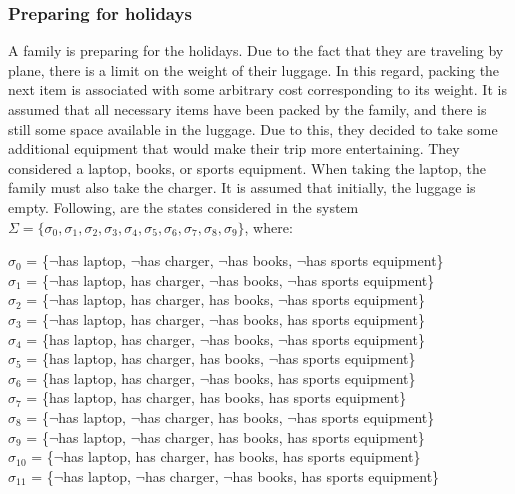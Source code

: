 \documentclass[a4paper]{article}
\begin{document}
\subsubsection{Preparing for holidays}
A family is preparing for the holidays. Due to the fact that they are traveling by plane, there is a limit on the weight of their luggage. In this regard, packing the next item is associated with some arbitrary cost corresponding to its weight. It is assumed that all necessary items have been packed by the family, and there is still some space available in the luggage. Due to this, they decided to take some additional equipment that would make their trip more entertaining. They considered a laptop, books, or sports equipment. When taking the laptop, the family must also take the charger. It is assumed that initially, the luggage is empty.
Following, are the states considered in the system $\Sigma = \{{\sigma_0, \sigma_1, \sigma_2, \sigma_3, \sigma_4, \sigma_5, \sigma_6, \sigma_7, \sigma_8, \sigma_9\}}$, where:
\begin{center}
$\sigma_0$ = \{$\neg$has laptop, $\neg$has charger, $\neg$has books, $\neg$has sports equipment\} \\[0.1\baselineskip]
$\sigma_1$ = \{$\neg$has laptop, has charger, $\neg$has books, $\neg$has sports equipment\} \\[0.1\baselineskip]
$\sigma_2$ = \{$\neg$has laptop, has charger, has books, $\neg$has sports equipment\} \\[0.1\baselineskip]
$\sigma_3$ = \{$\neg$has laptop, has charger, $\neg$has books, has sports equipment\} \\[0.1\baselineskip]
$\sigma_4$ = \{has laptop, has charger, $\neg$has books, $\neg$has sports equipment\} \\[0.1\baselineskip]
$\sigma_5$ = \{has laptop, has charger, has books, $\neg$has sports equipment\} \\[0.1\baselineskip]
$\sigma_6$ = \{has laptop, has charger, $\neg$has books, has sports equipment\} \\[0.1\baselineskip]
$\sigma_7$ = \{has laptop, has charger, has books, has sports equipment\} \\[0.1\baselineskip]
$\sigma_8$ = \{$\neg$has laptop, $\neg$has charger, has books, $\neg$has sports equipment\} \\[0.1\baselineskip]
$\sigma_9$ = \{$\neg$has laptop, $\neg$has charger, has books, has sports equipment\} \\[0.1\baselineskip]
$\sigma_{10}$ = \{$\neg$has laptop, has charger, has books, has sports equipment\} \\[0.1\baselineskip]
$\sigma_{11}$ = \{$\neg$has laptop, $\neg$has charger, $\neg$has books, has sports equipment\} \\[0.1\baselineskip]
\end{center}
\end{document}
